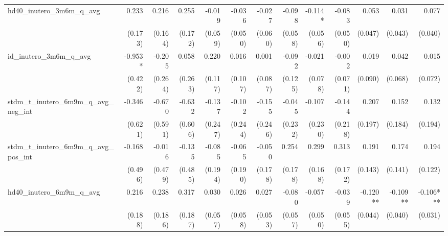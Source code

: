\begin{tabular}{lrrrrrrrrrrrr}
hd40\_inutero\_3m6m\_q\_avg                 &        0.233 &        0.216 &        0.255 &       -0.019 &       -0.036 &       -0.027 &       -0.098 &      -0.114* &       -0.083 &        0.053 &        0.031 &        0.077 \\ 
                                            &      (0.173) &      (0.164) &      (0.172) &      (0.059) &      (0.050) &      (0.060) &      (0.058) &      (0.056) &      (0.050) &      (0.047) &      (0.043) &      (0.040) \\ 
id\_inutero\_3m6m\_q\_avg                   &      -0.953* &       -0.205 &        0.058 &        0.220 &        0.016 &        0.001 &       -0.092 &       -0.021 &       -0.002 &        0.019 &        0.042 &        0.015 \\ 
                                            &      (0.422) &      (0.264) &      (0.263) &      (0.117) &      (0.107) &      (0.087) &      (0.125) &      (0.078) &      (0.071) &      (0.090) &      (0.068) &      (0.072) \\ 
stdm\_t\_inutero\_6m9m\_q\_avg\_neg\_int    &       -0.346 &       -0.670 &       -0.632 &       -0.137 &       -0.102 &       -0.155 &       -0.045 &       -0.107 &       -0.144 &        0.207 &        0.152 &        0.132 \\ 
                                            &      (0.621) &      (0.591) &      (0.606) &      (0.247) &      (0.244) &      (0.246) &      (0.232) &      (0.230) &      (0.218) &      (0.197) &      (0.184) &      (0.194) \\ 
stdm\_t\_inutero\_6m9m\_q\_avg\_pos\_int    &       -0.168 &       -0.016 &       -0.135 &       -0.085 &       -0.065 &       -0.050 &        0.254 &        0.299 &        0.313 &        0.191 &        0.174 &        0.194 \\ 
                                            &      (0.496) &      (0.479) &      (0.485) &      (0.194) &      (0.190) &      (0.178) &      (0.178) &      (0.168) &      (0.172) &      (0.143) &      (0.141) &      (0.122) \\ 
hd40\_inutero\_6m9m\_q\_avg                 &        0.216 &        0.238 &        0.317 &        0.030 &        0.026 &        0.027 &       -0.080 &       -0.057 &       -0.039 &     -0.120** &     -0.109** &    -0.106*** \\ 
                                            &      (0.188) &      (0.186) &      (0.187) &      (0.057) &      (0.058) &      (0.053) &      (0.057) &      (0.050) &      (0.055) &      (0.044) &      (0.040) &      (0.031) \\ 

\end{tabular}
